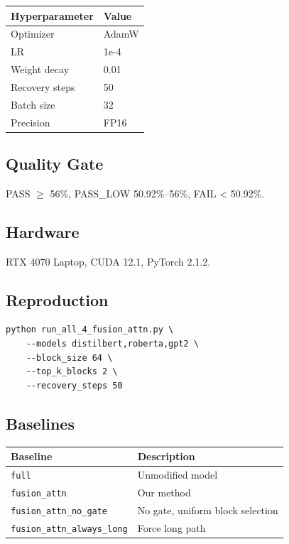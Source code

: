 \begin{table}[H]
\centering
\small
\begin{tabular}{ll}
\toprule
\textbf{Hyperparameter} & \textbf{Value} \\
\midrule
Optimizer & AdamW \\
LR & 1e-4 \\
Weight decay & 0.01 \\
Recovery steps & 50 \\
Batch size & 32 \\
Precision & FP16 \\
\bottomrule
\end{tabular}
\end{table}

\subsection{Quality Gate}

PASS $\ge$ 56\%, PASS\_LOW 50.92\%--56\%, FAIL < 50.92\%.

\subsection{Hardware}

RTX 4070 Laptop, CUDA 12.1, PyTorch 2.1.2.

\subsection{Reproduction}

\begin{lstlisting}
python run_all_4_fusion_attn.py \
    --models distilbert,roberta,gpt2 \
    --block_size 64 \
    --top_k_blocks 2 \
    --recovery_steps 50
\end{lstlisting}

\subsection{Baselines}

\begin{table}[H]
\centering
\small
\begin{tabular}{ll}
\toprule
\textbf{Baseline} & \textbf{Description} \\
\midrule
\texttt{full} & Unmodified model \\
\texttt{fusion\_attn} & Our method \\
\texttt{fusion\_attn\_no\_gate} & No gate, uniform block selection \\
\texttt{fusion\_attn\_always\_long} & Force long path \\
\bottomrule
\end{tabular}
\end{table}

